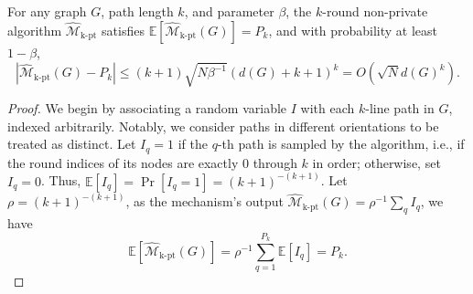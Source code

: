 



\begin{lemma}
For any graph $G$, path length $k$, and parameter $\beta$, 
the $k$-round non-private algorithm $\widehat{\mathcal{M}}_{\mathrm{k\text{-}pt}}$ satisfies $
    \mathbb{E}[\widehat{\mathcal{M}}_{\mathrm{k\text{-}pt}}(G)] = P_k $,
and with probability at least $1 - \beta$,
\begin{equation*}
    |\widehat{\mathcal{M}}_{\mathrm{k\text{-}pt}}(G)-P_k| \leq
    (k+1) \sqrt{N\beta^{-1}}(d(G)+k+1)^k
    = O(\sqrt{N} d(G)^k).
\end{equation*}
\end{lemma}


\begin{proof}

We begin by associating a random variable $I$ with each $k$-line path in $G$, indexed arbitrarily. 
Notably, we consider paths in different orientations to be treated as distinct.
Let $I_q = 1$ if the $q$-th path is sampled by the algorithm, i.e., if the round indices of its nodes are exactly $0$ through $k$ in order; otherwise, set $I_q = 0$. 
Thus, $\mathbb{E}[I_q] = \Pr[I_q=1] = (k+1)^{-(k+1)}$.
Let $\rho = (k+1)^{-(k+1)}$, as the mechanism's output $\widehat{\mathcal{M}}_{\mathrm{k\text{-}pt}}(G) = \rho^{-1}\sum_q I_q$, we have
\begin{equation*}
    \mathbb{E}[\widehat{\mathcal{M}}_{\mathrm{k\text{-}pt}}(G)] = \rho^{-1}\sum_{q=1}^{P_k} \mathbb{E}[I_q] = P_k. 
\end{equation*}


\end{proof}
